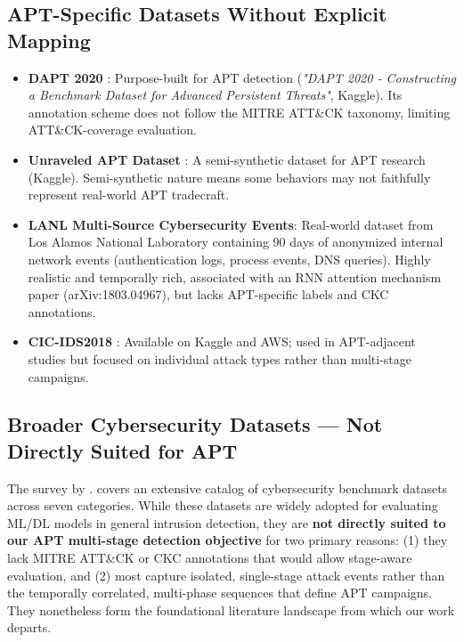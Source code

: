 \subsection{APT-Specific Datasets Without Explicit Mapping}

\begin{itemize}
    \item \textbf{DAPT 2020} \cite{myneni2020dapt}: Purpose-built for APT detection (\textit{"DAPT 2020 - Constructing a Benchmark Dataset for Advanced Persistent Threats"}, Kaggle). Its annotation scheme does not follow the MITRE ATT\&CK taxonomy, limiting ATT\&CK-coverage evaluation.
    \item \textbf{Unraveled APT Dataset} \cite{myneni2023unraveled}: A semi-synthetic dataset for APT research (Kaggle). Semi-synthetic nature means some behaviors may not faithfully represent real-world APT tradecraft.
    \item \textbf{LANL Multi-Source Cybersecurity Events}: Real-world dataset from Los Alamos National Laboratory containing 90 days of anonymized internal network events (authentication logs, process events, DNS queries). Highly realistic and temporally rich, associated with an RNN attention mechanism paper (arXiv:1803.04967), but lacks APT-specific labels and CKC annotations.
    \item \textbf{CIC-IDS2018} \cite{hewapathirana2025comparative}: Available on Kaggle and AWS; used in APT-adjacent studies but focused on individual attack types rather than multi-stage campaigns.
\end{itemize}


\subsection{Broader Cybersecurity Datasets --- Not Directly Suited for APT}

The survey by \cite{ankalaki2025cyber}. covers an extensive catalog of cybersecurity benchmark datasets across seven categories. While these datasets are widely adopted for evaluating ML/DL models in general intrusion detection, they are \textbf{not directly suited to our APT multi-stage detection objective} for two primary reasons: (1) they lack MITRE ATT\&CK or CKC annotations that would allow stage-aware evaluation, and (2) most capture isolated, single-stage attack events rather than the temporally correlated, multi-phase sequences that define APT campaigns. They nonetheless form the foundational literature landscape from which our work departs.


